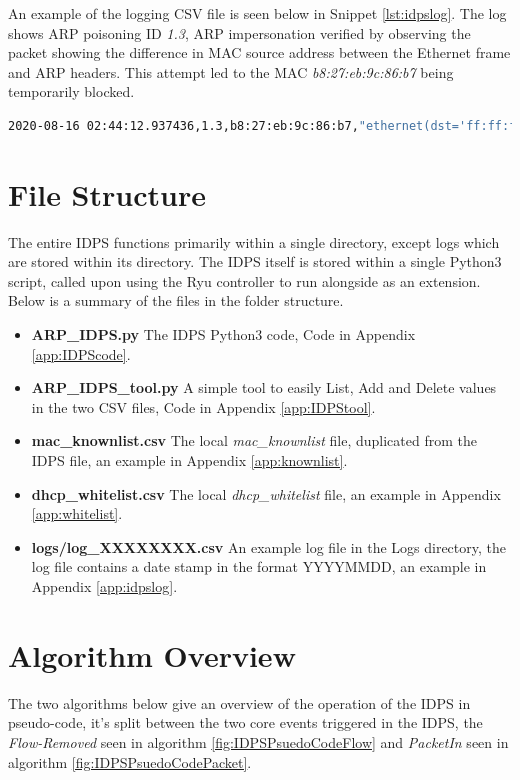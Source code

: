 \documentclass[12pt, oneside]{book}
\begin{document}
An example of the logging CSV file is seen below in Snippet \ref{lst:idpslog}. The log shows ARP poisoning ID \emph{1.3},
ARP impersonation verified by observing the packet showing the difference in MAC source address between the Ethernet frame and ARP
headers. This attempt led to the MAC \emph{b8:27:eb:9c:86:b7} being temporarily blocked.

\begin{lstlisting}[language=Bash,caption={IDPS log example},captionpos=b,label={lst:idpslog}]
2020-08-16 02:44:12.937436,1.3,b8:27:eb:9c:86:b7,"ethernet(dst='ff:ff:ff:ff:ff:ff',ethertype=2054,src='b8:27:eb:9c:86:b7'), arp(dst_ip='192.168.4.178',dst_mac='ff:ff:ff:ff:ff:ff',hlen=6,hwtype=1,opcode=1,plen=4,proto=2048,src_ip='192.168.4.1',src_mac='b8:27:eb:97:23:a2')", MAC block 300s
\end{lstlisting}

\section{File Structure}
The entire IDPS functions primarily within a single directory, except logs which are stored within its directory.
The IDPS itself is stored within a single Python3 script, called upon using the Ryu controller to run alongside as an 
extension. Below is a summary of the files in the folder structure.
\begin{itemize}
	\itemsep0em
	\item \textbf{ARP\_IDPS.py} The IDPS Python3 code, Code in Appendix \ref{app:IDPScode}.
	\item \textbf{ARP\_IDPS\_tool.py} A simple tool to easily List, Add and Delete values in the two CSV files, Code in Appendix \ref{app:IDPStool}.
	\item \textbf{mac\_knownlist.csv} The local \emph{mac\_knownlist} file, duplicated from the IDPS file, an example in Appendix \ref{app:knownlist}.
	\item \textbf{dhcp\_whitelist.csv} The local \emph{dhcp\_whitelist} file, an example in Appendix \ref{app:whitelist}.
	\item \textbf{logs/log\_XXXXXXXX.csv} An example log file in the Logs directory, the log file contains a date stamp in the format YYYYMMDD, an example in Appendix \ref{app:idpslog}.
\end{itemize}

\section{Algorithm Overview}
The two algorithms below give an overview of the operation of the IDPS in pseudo-code, it's split between
the two core events triggered in the IDPS, the \emph{Flow-Removed} seen in algorithm \ref{fig:IDPSPsuedoCodeFlow}
and \emph{PacketIn} seen in algorithm \ref{fig:IDPSPsuedoCodePacket}.
\end{document}
